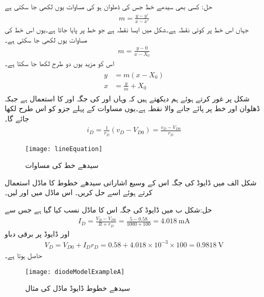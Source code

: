 حل: کسی بھی سیدھے خط جس کی ڈھلوان   ہو کی مساوات یوں لکھی جا سکتی ہے
\begin{align*}
m=\frac{y-y'}{x-x'}
\end{align*}
جہاں   اس خط پر کوئی نقطہ ہے۔شکل میں  ایسا نقطہ ہے جو خط پر پایا جاتا ہے۔یوں اس خط کی مساوات یوں لکھی جا سکتی ہے۔
\begin{align*}
m=\frac{y-0}{x-X_0}
\end{align*}
اس کو مزید یوں دو طرح لکھا جا سکتا ہے۔
\begin{gather} \label{مساوات_ڈایوڈ_سیدھے_خط_کے_دو_مساوات}
\begin{aligned}
y&=m (x-X_0)\\
x&=\frac{y}{m}+X_0
\end{aligned}
\end{gather}
شکل   پر غور کرتے ہوئے ہم دیکھتے ہیں کہ وہاں  اور  کی جگہ  اور  کا استعمال ہے جبکہ ڈھلوان  اور خط پر پائے جانے والا نقطہ  ہے۔یوں مساوات   کے پہلے جزو کو اس طرح لکھا جائے گا۔
\begin{align*}
i_D=\frac{1}{r_D} (v_D-V_{D0})=\frac{v_D-V_{D0}}{r_D}
\end{align*}
%
\begin{figure}
\centering
\texttt{[image: lineEquation]}
\caption{ سیدھے خط کی مساوات}
\label{شکل_سیدھے_خط_کی_مساوات}
\end{figure}


 
شکل  الف میں ڈایوڈ کی جگہ اس کے وسیع اشاراتی سیدھے خطوط کا ماڈل استعمال کرتے ہوئے اسے حل کریں۔
اس ماڈل میں  اور   لیں۔

حل:شکل  ب میں ڈایوڈ کی جگہ اس کا ماڈل نسب کیا گیا ہے جس سے
\begin{align*}
I_D=\frac{V_B-V_{D0}}{R+r_D}=\frac{5-0.58}{1000+100}=\SI{4.018}{\milli \ampere}
\end{align*}
اور ڈایوڈ پر برقی دباو
\begin{align*}
V_D=V_{D0}+I_D r_D=0.58+4.018 \times 10^{-3} \times 100=\SI{0.9818}{\volt}
\end{align*}
حاصل ہوتا ہے۔

\begin{figure}
\centering
\texttt{[image: diodeModelExampleA]}
\caption{سیدھے خطوط  ڈایوڈ ماڈل کی مثال}
\label{شکل_سیدھے_خط_کا_ماڈل}
\end{figure}

